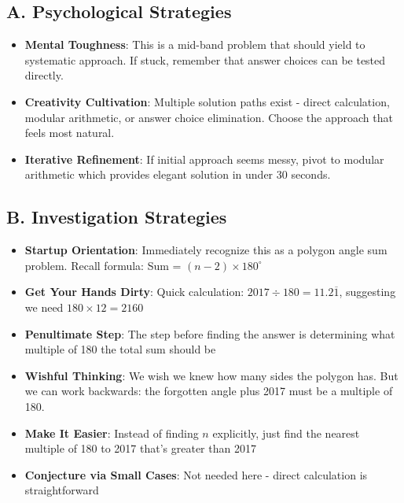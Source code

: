 \documentclass[]{article}
\begin{document}
\begin{strategicbox}
\subsection*{A. Psychological Strategies}
\begin{itemize}[leftmargin=*]
    \item \textbf{Mental Toughness}: This is a mid-band problem that should yield to systematic approach. If stuck, remember that answer choices can be tested directly.
    
    \item \textbf{Creativity Cultivation}: Multiple solution paths exist - direct calculation, modular arithmetic, or answer choice elimination. Choose the approach that feels most natural.
    
    \item \textbf{Iterative Refinement}: If initial approach seems messy, pivot to modular arithmetic which provides elegant solution in under 30 seconds.
\end{itemize}

\subsection*{B. Investigation Strategies}
\begin{itemize}[leftmargin=*]
    \item \textbf{Startup Orientation}: Immediately recognize this as a polygon angle sum problem. Recall formula: Sum = $(n-2) \times 180^\circ$
    
    \item \textbf{Get Your Hands Dirty}: Quick calculation: $2017 \div 180 = 11.2\overline{1}$, suggesting we need $180 \times 12 = 2160$
    
    \item \textbf{Penultimate Step}: The step before finding the answer is determining what multiple of 180 the total sum should be
    
    \item \textbf{Wishful Thinking}: We wish we knew how many sides the polygon has. But we can work backwards: the forgotten angle plus 2017 must be a multiple of 180.
    
    \item \textbf{Make It Easier}: Instead of finding $n$ explicitly, just find the nearest multiple of 180 to 2017 that's greater than 2017
    
    \item \textbf{Conjecture via Small Cases}: Not needed here - direct calculation is straightforward
    

\end{itemize}
\end{strategicbox}
\end{document}
